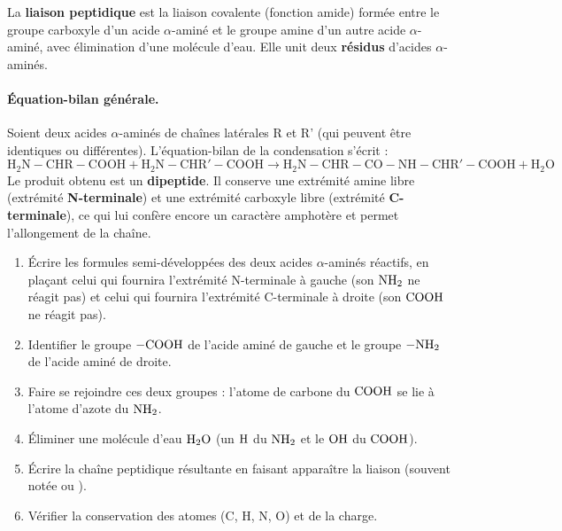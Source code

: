 \documentclass[11pt]{article}
\begin{document}
\begin{definition}
La \textbf{liaison peptidique} est la liaison covalente  (fonction amide) formée entre le groupe carboxyle d'un acide $\alpha$-aminé et le groupe amine d'un autre acide $\alpha$-aminé, avec élimination d'une molécule d'eau. Elle unit deux \textbf{résidus} d'acides $\alpha$-aminés.
\end{definition}

\paragraph{Équation-bilan générale.}
Soient deux acides $\alpha$-aminés de chaînes latérales R et R' (qui peuvent être identiques ou différentes). L'équation-bilan de la condensation s'écrit :
\[
\mathrm{H_2N\!-\!CHR\!-\!COOH} + \mathrm{H_2N\!-\!CHR'\!-\!COOH} \longrightarrow \mathrm{H_2N\!-\!CHR\!-\!CO\!-\!NH\!-\!CHR'\!-\!COOH} + \mathrm{H_2O}
\]
Le produit obtenu est un \textbf{dipeptide}. Il conserve une extrémité amine libre (extrémité \textbf{N-terminale}) et une extrémité carboxyle libre (extrémité \textbf{C-terminale}), ce qui lui confère encore un caractère amphotère et permet l'allongement de la chaîne.

\begin{methode}
\begin{enumerate}
    \item Écrire les formules semi-développées des deux acides $\alpha$-aminés réactifs, en plaçant celui qui fournira l'extrémité N-terminale à gauche (son $\ce{NH2}$ ne réagit pas) et celui qui fournira l'extrémité C-terminale à droite (son $\ce{COOH}$ ne réagit pas).
    \item Identifier le groupe $\ce{-COOH}$ de l'acide aminé de gauche et le groupe $\ce{-NH2}$ de l'acide aminé de droite.
    \item Faire se rejoindre ces deux groupes : l'atome de carbone du $\ce{COOH}$ se lie à l'atome d'azote du $\ce{NH2}$.
    \item Éliminer une molécule d'eau $\ce{H2O}$ (un $\ce{H}$ du $\ce{NH2}$ et le $\ce{OH}$ du $\ce{COOH}$).
    \item Écrire la chaîne peptidique résultante en faisant apparaître la liaison  (souvent notée  ou ).
    \item Vérifier la conservation des atomes (C, H, N, O) et de la charge.
\end{enumerate}
\end{methode}
\end{document}
